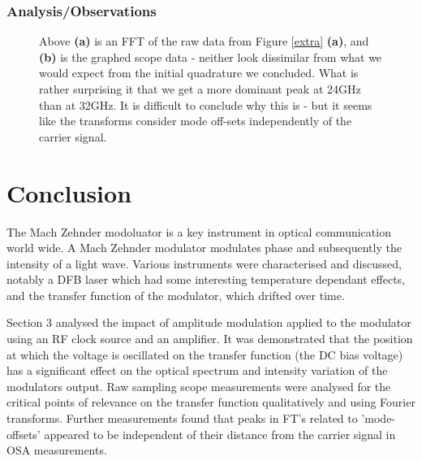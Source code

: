 \documentclass[12pt,a4paper]{report}
\newcommand{\mychapter}[2]{
    \vspace{-1.5cm}
    \setcounter{chapter}{#1}
    \setcounter{section}{0}
    \chapter*{#2}
    \addcontentsline{toc}{chapter}{#2}
    \vspace{-1.25cm}
}
\begin{document}
\subsection{Analysis/Observations}
\begin{figure}
    \centering
    \quad
    \caption{Above \textbf{(a)} is an FFT of the raw data from Figure \ref{extra} \textbf{(a)}, and \textbf{(b)} is the graphed scope data - neither look dissimilar from what we would expect from the initial quadrature we concluded. What is rather surprising it that we get a more dominant peak at 24GHz than at 32GHz. It is difficult to conclude why this is - but it seems like the transforms consider mode off-sets independently of the carrier signal. }
    \label{extra2}
    \vspace{-12pt}
\end{figure}




\mychapter{4}{Conclusion}
The Mach Zehnder modoluator is a key instrument in optical communication world wide. A Mach Zehnder modulator modulates phase and subsequently the intensity of a light wave. Various instruments were characterised and discussed, notably a DFB laser which had some interesting temperature dependant effects, and the transfer function of the modulator, which drifted over time.

Section 3 analysed the impact of amplitude modulation applied to the modulator using an RF clock source and an amplifier. It was demonstrated that the position at which the voltage is oscillated on the transfer function (the DC bias voltage) has a significant effect on the optical spectrum and intensity variation of the modulators output. Raw sampling scope measurements were analysed for the critical points of relevance on the transfer function qualitatively and using Fourier transforms. Further measurements found that peaks in FT's related to 'mode-offsets' appeared to be independent of their distance from the carrier signal in OSA measurements.
\end{document}
